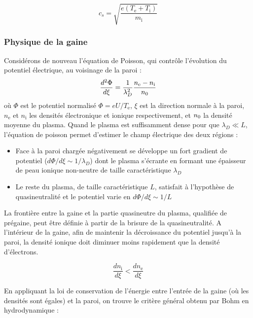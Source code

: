 \begin{refsection}
\begin{equation}
c_s=\sqrt{\frac{e (T_\text{e}+T_\text{i})}{m_\text{i}}}
\end{equation}

\subsubsection{Physique de la gaine}
\label{1-gaine}
Considérons de nouveau l'équation de Poisson, qui contrôle l'évolution du
potentiel électrique, au voisinage de la paroi :
\begin{equation}
\frac{d^{{2}}\Phi}{d\xi}=\frac{1}{\lambda_D^{{2}}}\frac{n_\text{e}-n_\text{i}}{n{_{0}}}
\end{equation}
 où $\Phi$ est le potentiel normalisé $\Phi=eU/T_\text{e}$, $\xi$ est la
 direction normale à la paroi, $n_\text{e}$ et $n_\text{i}$ les densités
 électronique et ionique respectivement, et $n{_{0}}$ la densité
 moyenne du plasma. Quand le plasma est suffisamment dense pour que $\lambda_D\ll
 L$, l'équation de poisson permet d'estimer le champ électrique des deux
 régions :

 \begin{itemize}
   \item Face à la paroi chargée négativement se
   développe un fort gradient de potentiel ($d\Phi/d\xi\sim 1/\lambda_D$) dont le plasma
   s'écrante en formant une épaisseur de peau ionique non-neutre de
   taille caractéristique $\lambda_D$
   \item Le reste du plasma, de taille caractéristique $L$, satisfait
   à l'hypothèse de quasineutralité et le potentiel varie en
   $d\Phi/d\xi\sim1/L$
 \end{itemize}

La frontière entre la gaine et la partie
quasineutre du plasma, qualifiée de prégaine, peut être définie à partir de la
brisure de la quasineutralité. A l'intérieur de la gaine, afin de maintenir la
décroissance du potentiel jusqu'à la paroi, la densité ionique doit diminuer
moins rapidement que la densité d'électrons. 

\begin{equation}
	\frac{dn_\text{i}}{d\xi}<\frac{dn_\text{e}}{d\xi}
\end{equation}

En appliquant la loi de conservation de l'énergie entre
l'entrée de la gaine (où les densités sont égales) et la paroi, on trouve le
critère général obtenu par Bohm en hydrodynamique :


\end{refsection}
